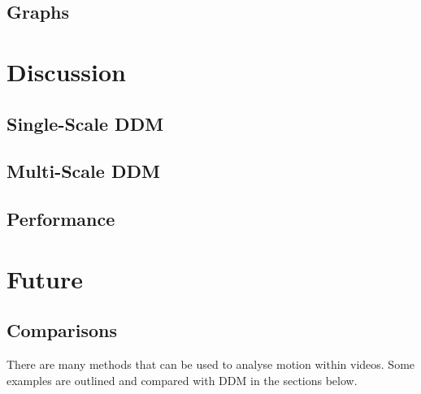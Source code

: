 \documentclass[11pt]{article}
\begin{document}
\subsection{Graphs}

\clearpage
\section{Discussion}
\subsection{Single-Scale DDM}
\subsection{Multi-Scale DDM}
\subsection{Performance}
\label{section:performance}

\clearpage
\section{Future}
\subsection{Comparisons}
There are many methods that can be used to analyse motion within videos. Some examples are outlined and compared with DDM in the sections below.
\end{document}
